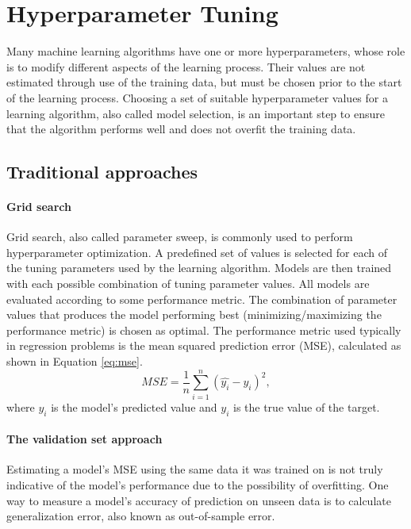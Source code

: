\chapter{Hyperparameter Tuning}
Many machine learning algorithms have one or more hyperparameters, whose role is to modify different aspects of the learning process. Their values are not estimated through use of the training data, but must be chosen prior to the start of the learning process. Choosing a set of suitable hyperparameter values for a learning algorithm, also called model selection, is an important step to ensure that the algorithm performs well and does not overfit the training data.

\section{Traditional approaches} \label{sec:trad_tuning}

\subsubsection{Grid search}
Grid search, also called parameter sweep, is commonly used to perform hyperparameter optimization. A predefined set of values is selected for each of the tuning parameters used by the learning algorithm. Models are then trained with each possible combination of tuning parameter values. All models are evaluated according to some performance metric. The combination of parameter values that produces the model performing best (minimizing/maximizing the performance metric) is chosen as optimal. The performance metric used typically in regression problems is the mean squared prediction error (MSE), calculated as shown in Equation \ref{eq:mse}.
\begin{equation} \label{eq:mse}
MSE = \frac{1}{n} \sum_{i=1}^{n} (\hat{y_i}-y_i)^2, 
\end{equation}
where $\hat{y_i}$ is the model's predicted value and $y_i$ is the true value of the target. 

\subsubsection{The validation set approach}
Estimating a model's MSE using the same data it was trained on is not truly indicative of the model's performance due to the possibility of overfitting. One way to measure a model's accuracy of prediction on unseen data is to calculate generalization error, also known as out-of-sample error. 

